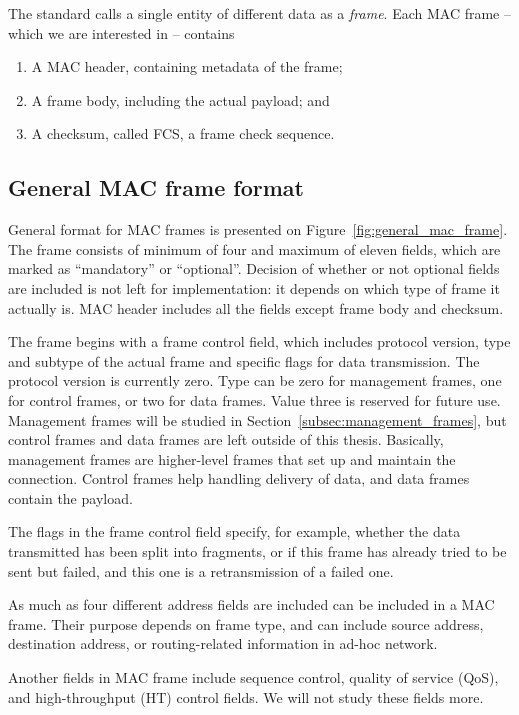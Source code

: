 \documentclass[12pt,a4paper,oneside,pdftex]{report}
\begin{document}
The standard calls a single entity of different data as a \emph{frame}. Each MAC frame -- which we are interested in -- contains

\begin{enumerate}
    \item A MAC header, containing metadata of the frame;
    \item A frame body, including the actual payload; and
    \item A checksum, called FCS, a frame check sequence.
\end{enumerate}

\subsection{General MAC frame format}

General format for MAC frames is presented on Figure~\ref{fig:general_mac_frame}. The frame consists of minimum of four and maximum of eleven fields, which are marked as ``mandatory'' or ``optional''. Decision of whether or not optional fields are included is not left for implementation: it depends on which type of frame it actually is. MAC header includes all the fields except frame body and checksum.

The frame begins with a frame control field, which includes protocol version, type and subtype of the actual frame and specific flags for data transmission. The protocol version is currently zero. Type can be zero for management frames, one for control frames, or two for data frames. Value three is reserved for future use. Management frames will be studied in Section~\ref{subsec:management_frames}, but control frames and data frames are left outside of this thesis. Basically, management frames are higher-level frames that set up and maintain the connection. Control frames help handling delivery of data, and data frames contain the payload.

The flags in the frame control field specify, for example, whether the data transmitted has been split into fragments, or if this frame has already tried to be sent but failed, and this one is a retransmission of a failed one.

As much as four different address fields are included can be included in a MAC frame. Their purpose depends on frame type, and can include source address, destination address, or routing-related information in ad-hoc network.

Another fields in MAC frame include sequence control, quality of service (QoS), and high-throughput (HT) control fields. We will not study these fields more.
\end{document}
